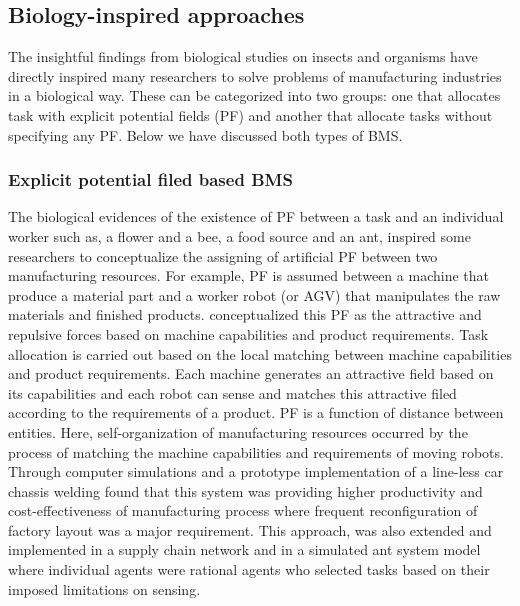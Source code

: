 \subsection{Biology-inspired approaches}
The insightful findings from biological studies on insects and organisms have directly inspired many researchers to solve problems of manufacturing industries in a biological way. These can be categorized into two groups: one that allocates task with explicit potential fields (PF) and another that allocate tasks without specifying any PF. Below we have discussed both types of BMS.
\subsubsection*{Explicit potential filed based BMS}
The biological evidences of the existence of PF between a task and an individual worker such as, a flower and a bee, a food source and an ant,  inspired some researchers to conceptualize the assigning of artificial PF between two manufacturing resources. For example, PF is assumed between a machine that produce a material part and a worker robot (or AGV) that manipulates the raw materials and finished products. \cite{Ueda2006} conceptualized this PF as the attractive and repulsive forces based on machine capabilities and product requirements. Task allocation is carried out based on the local matching between machine capabilities and product requirements. Each machine generates an attractive field based on its capabilities and each robot can sense and matches this attractive filed according to the requirements of a product. PF is a function of distance between entities. Here, self-organization of manufacturing resources occurred by the process of matching the machine capabilities and requirements of moving robots.  Through computer simulations and a prototype implementation of a line-less car chassis welding \cite{Ueda2006} found that this system was providing higher productivity and cost-effectiveness of manufacturing process where frequent reconfiguration of factory layout was a major requirement. This approach, was also extended and implemented in a supply chain network and in a simulated ant system model where individual agents were rational agents who selected tasks based on their imposed limitations on sensing. 
